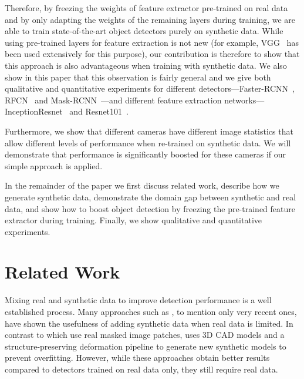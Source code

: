 \documentclass[10pt,twocolumn,letterpaper]{article}
\begin{document}
Therefore, by freezing the weights of feature extractor pre-trained on real data
and by only adapting the weights of the remaining layers during training, we are
able to train state-of-the-art object detectors purely on synthetic data.  While
using  pre-trained  layers for  feature  extraction  is  not new  (for  example,
VGG~\cite{vgg}   has  been   used  extensively   for  this   purpose),  our
contribution is therefore  to show that this approach is  also advantageous when
training with synthetic data.  We also  show in this paper that this observation
is fairly general and we give  both qualitative and quantitative experiments for
different   detectors---Faster-RCNN~\cite{faster_rcnn},   RFCN~\cite{rfcn}   and
Mask-RCNN~\cite{mask_rcnn}---and       different        feature       extraction
networks---InceptionResnet~\cite{inception_resnet}                           and
Resnet101~\cite{resnet101}.


Furthermore, we show that different cameras have different image statistics that
allow different  levels of performance  when re-trained on  synthetic data.
We will demonstrate that performance  is significantly boosted for these cameras
if our simple approach is applied.


In the  remainder of the  paper we  first discuss  related work, describe  how we
generate synthetic data,  demonstrate the domain gap between  synthetic and real
data, and show how to boost  object detection by freezing the pre-trained feature
extractor  during  training.  Finally,  we  show  qualitative  and  quantitative
experiments.




\section{Related Work}
\label{sec:related_work}

Mixing real  and synthetic data to improve detection  performance is a
well      established      process.       Many      approaches      such      as
\cite{Dwibedi17,Georgakis17,Su15}, to mention only  very recent ones, have shown
the usefulness of  adding synthetic data when real data  is limited. In contrast
to \cite{Dwibedi17,Georgakis17} which use real masked image patches, \cite{Su15}
uses 3D CAD  models and a structure-preserving deformation  pipeline to generate
new  synthetic models  to prevent  overfitting.  However,  while these
approaches  obtain better  results compared  to detectors  trained on  real data
only, they still require real data.
\end{document}
